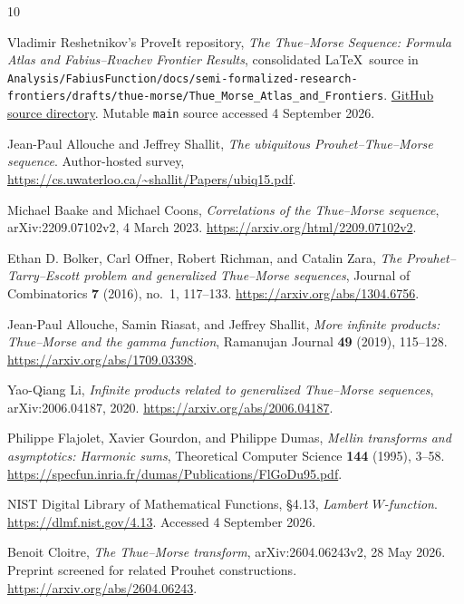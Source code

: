 \documentclass[11pt,oneside]{article}
\numberwithin{equation}{section}
\theoremstyle{definition}
\theoremstyle{remark}
\begin{document}
\clearpage
\begin{thebibliography}{10}
\raggedright
{}
Vladimir Reshetnikov's ProveIt repository,
\emph{The Thue--Morse Sequence: Formula Atlas and Fabius--Rvachev Frontier Results},
consolidated \LaTeX\ source in
\nolinkurl{Analysis/FabiusFunction/docs/semi-formalized-research-frontiers/drafts/thue-morse/Thue_Morse_Atlas_and_Frontiers}.
\href{https://github.com/VladimirReshetnikov/ProveIt/tree/main/Analysis/FabiusFunction/docs/semi-formalized-research-frontiers/drafts/thue-morse/Thue_Morse_Atlas_and_Frontiers}{GitHub source directory}.
Mutable \texttt{main} source accessed 4 September 2026.

Jean-Paul Allouche and Jeffrey Shallit,
\emph{The ubiquitous Prouhet--Thue--Morse sequence}.
Author-hosted survey,
\url{https://cs.uwaterloo.ca/~shallit/Papers/ubiq15.pdf}.

Michael Baake and Michael Coons,
\emph{Correlations of the Thue--Morse sequence},
arXiv:2209.07102v2, 4 March 2023.
\url{https://arxiv.org/html/2209.07102v2}.

Ethan D. Bolker, Carl Offner, Robert Richman, and Catalin Zara,
\emph{The Prouhet--Tarry--Escott problem and generalized Thue--Morse sequences},
Journal of Combinatorics \textbf{7} (2016), no.~1, 117--133.
\url{https://arxiv.org/abs/1304.6756}.

Jean-Paul Allouche, Samin Riasat, and Jeffrey Shallit,
\emph{More infinite products: Thue--Morse and the gamma function},
Ramanujan Journal \textbf{49} (2019), 115--128.
\url{https://arxiv.org/abs/1709.03398}.

Yao-Qiang Li,
\emph{Infinite products related to generalized Thue--Morse sequences},
arXiv:2006.04187, 2020.
\url{https://arxiv.org/abs/2006.04187}.

Philippe Flajolet, Xavier Gourdon, and Philippe Dumas,
\emph{Mellin transforms and asymptotics: Harmonic sums},
Theoretical Computer Science \textbf{144} (1995), 3--58.
\url{https://specfun.inria.fr/dumas/Publications/FlGoDu95.pdf}.

NIST Digital Library of Mathematical Functions,
\S4.13, \emph{Lambert \(W\)-function}.
\url{https://dlmf.nist.gov/4.13}. Accessed 4 September 2026.

Benoit Cloitre,
\emph{The Thue--Morse transform}, arXiv:2604.06243v2,
28 May 2026. Preprint screened for related Prouhet constructions.
\url{https://arxiv.org/abs/2604.06243}.
\end{thebibliography}
\end{document}
